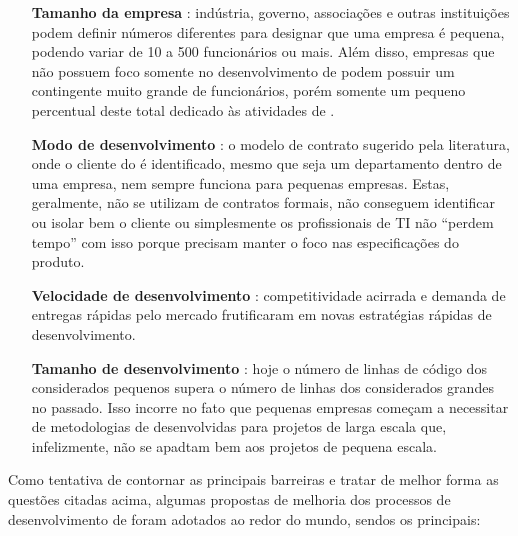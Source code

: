 \begin{itemize}

\item[\textbf{Tamanho da empresa}]: indústria, governo, associações e outras instituições podem definir números diferentes para designar que uma empresa é pequena, podendo variar de 10 a 500 funcionários ou mais. Além disso, empresas que não possuem foco somente no desenvolvimento de \sw podem possuir um contingente muito grande de funcionários, porém somente um pequeno percentual deste total dedicado às atividades de \sw.

\item[\textbf{Modo de desenvolvimento}]: o modelo de contrato sugerido pela literatura, onde o cliente do \sw é identificado, mesmo que seja um departamento dentro de uma empresa, nem sempre funciona para pequenas empresas. Estas, geralmente, não se utilizam de contratos formais, não conseguem identificar ou isolar bem o cliente ou simplesmente os profissionais de TI não ``perdem tempo'' com isso porque precisam manter o foco nas especificações do produto.

\item[\textbf{Velocidade de desenvolvimento}]: competitividade acirrada e demanda de entregas rápidas pelo mercado frutificaram em novas estratégias rápidas de desenvolvimento.
 
\item[\textbf{Tamanho de desenvolvimento}]: hoje o número de linhas de código dos \sws considerados pequenos supera o número de linhas dos \sws considerados grandes no passado. Isso incorre no fato que pequenas empresas começam a necessitar de metodologias de \sw desenvolvidas para projetos de larga escala que, infelizmente, não se apadtam bem aos projetos de pequena escala.
 
\end{itemize}

Como tentativa de contornar as principais barreiras e tratar de melhor forma as questões citadas acima, algumas propostas de melhoria dos processos de desenvolvimento de \sw foram adotados ao redor do mundo, sendos os principais:

